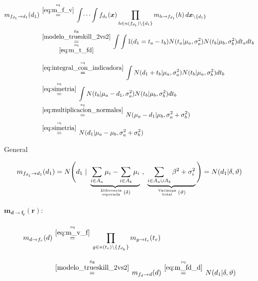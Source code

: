\documentclass[article]{jss}
\newcommand\hfrac[2]{\genfrac{}{}{0pt}{}{#1}{#2}} %
\begin{document}
\begin{appendix}
\begin{equation}
 \begin{split}
  m_{f_{d_1} \rightarrow d_1}(d_1) & \overset{\hfrac{\text{eq}}{\ref{eq:m_f_v}}}{=} \int \dots \int f_{d_1}(\bm{x}) \prod_{h \in n(f_{d_1}) \setminus \{d_1\} } m_{h \rightarrow f_{d_1}}(h) \, d\bm{x}_{\setminus \{d_1\} }  \\
  & \overset{\hfrac{\text{fig}}{\ref{modelo_trueskill_2vs2}}}{\underset{\hfrac{\text{eq}}{\ref{eq:m_t_fd}}}{=}} \int \int \mathbb{I}(d_1 = t_a - t_b) N(t_a| \mu_a, \sigma_a^2)  N(t_b| \mu_b, \sigma_b^2)  dt_adt_b \\[0.25cm]
  & \overset{\hfrac{\text{eq}}{\ref{eq:integral_con_indicadora}}}{=} \int N(d_1 + t_b| \mu_a, \sigma_a^2)  N(t_b| \mu_a, \sigma_b^2)  dt_b \\
  & \overset{\hfrac{\text{eq}}{\ref{eq:simetria}}}{=} \int N(t_b| \mu_a - d_1 , \sigma_a^2)  N(t_b| \mu_b, \sigma_b^2)  dt_b \\
  & \overset{\hfrac{\text{eq}}{\ref{eq:multiplicacion_normales}}}{=} N( \mu_a - d_1 | \mu_b, \sigma_a^2 +\sigma_b^2  ) \\
  & \overset{\hfrac{\text{eq}}{\ref{eq:simetria}}}{=} N( d_1 | \mu_a - \mu_b, \sigma_a^2 +\sigma_b^2  )
 \end{split}
\end{equation}

General

\begin{equation} \label{eq:m_fd_d}
 m_{f_{d_1} \rightarrow d_1}(d_1) = N\Bigg(d_1 \ | \ \underbrace{\sum_{i \in A_a} \mu_i - \sum_{i \in A_b} \mu_i}_{\hfrac{\text{Diferencia}}{\text{esperada}} \, (\delta)} \ , \  \underbrace{\sum_{i \in A_a \cup A_b} \beta^2 + \sigma_i^2}_{\hfrac{\text{Varianza}}{\text{total}} \, (\vartheta) } \Bigg) = N(d_1 | \delta, \vartheta)
\end{equation}

\paragraph{$\bm{m_{d \rightarrow f_r}(r)}:$}

\begin{equation}\label{eq:m_d_fr}
\begin{split}
m_{d \rightarrow f_r}(d) & \overset{\hfrac{\text{eq}}{\ref{eq:m_v_f}}}{=} \prod_{g \in n(t_e) \setminus  \{f_{d_{k}} \}} m_{g \rightarrow t_e} (t_e) \\[0.3cm]
 & \overset{\hfrac{\text{fig}}{\ref{modelo_trueskill_2vs2}}}{=} m_{f_d \rightarrow d}(d) \overset{\hfrac{\text{eq}}{\ref{eq:m_fd_d}}}{=} N(d_1| \delta, \vartheta)
\end{split}
\end{equation}


\end{appendix}
\end{document}
